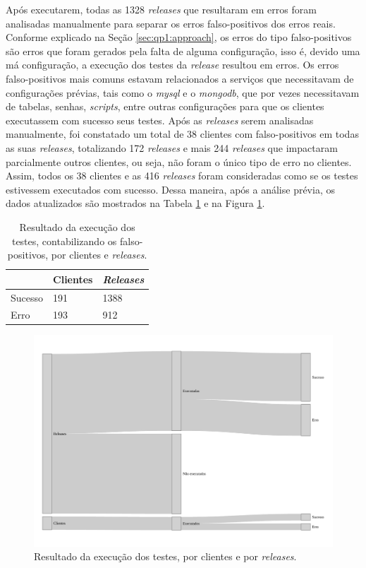 Após executarem, todas as 1328 \textit{releases} que resultaram em erros foram analisadas manualmente para separar os erros falso-positivos dos erros reais. Conforme explicado na Seção \ref{sec:qp1:approach}, os erros do tipo falso-positivos são erros que foram gerados pela falta de alguma configuração, isso é, devido uma má configuração, a execução dos testes da \textit{release} resultou em erros. Os erros falso-positivos mais comuns estavam relacionados a serviços que necessitavam de configurações prévias, tais como o \textit{mysql} e o \textit{mongodb}, que por vezes necessitavam de tabelas, senhas, \textit{scripts}, entre outras configurações para que os clientes executassem com sucesso seus testes. Após as \textit{releases} serem analisadas manualmente, foi constatado um total de 38 clientes com falso-positivos em todas as suas \textit{releases}, totalizando 172 \textit{releases} e mais 244 \textit{releases} que impactaram parcialmente outros clientes, ou seja, não foram o único tipo de erro no clientes. Assim, todos os 38 clientes e as 416 \textit{releases} foram consideradas como se os testes estivessem executados com sucesso. Dessa maneira, após a análise prévia, os dados atualizados são mostrados na Tabela \ref{tab:res_rq1_2} e na Figura \ref{fig:res_rq1_g}.

\begin{table}[]
\centering
\begin{tabular}{|l|l|l|}
\hline
                    & Clientes & \textit{Releases} \\ \hline
    Sucesso         & 191     & 1388     \\
    Erro            & 193     & 912     \\ \hline
\end{tabular}
\caption{Resultado da execução dos testes, contabilizando os falso-positivos, por clientes e \textit{releases}.}
\label{tab:res_rq1_2}
\end{table}

\begin{figure}
    \centering
    \includegraphics[scale=0.5]{figuras/general_results.pdf}
    \caption{Resultado da execução dos testes, por clientes e por \textit{releases}.}
    \label{fig:res_rq1_g}
\end{figure}{}
